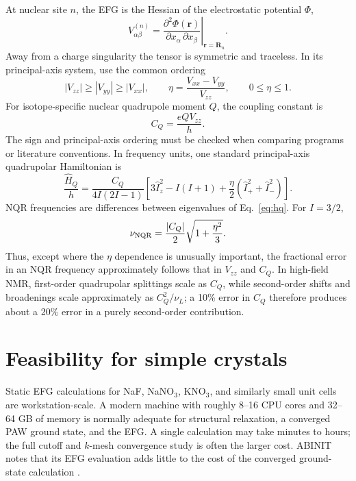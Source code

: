 \documentclass[10pt]{article}
\newcommand{\R}{\mathbf{R}}
\begin{document}
At nuclear site $n$, the EFG is the Hessian of the electrostatic potential $\Phi$,
\begin{equation}
  V_{\alpha\beta}^{(n)}=
  \left.\frac{\partial^2\Phi(\mathbf r)}{\partial x_\alpha\,\partial x_\beta}\right|_{\mathbf r=\R_n}.
\end{equation}
Away from a charge singularity the tensor is symmetric and traceless.  In its principal-axis system, use the common ordering
\begin{equation}
 |V_{zz}|\ge |V_{yy}|\ge |V_{xx}|,
 \qquad
 \eta=\frac{V_{xx}-V_{yy}}{V_{zz}},
 \qquad 0\le \eta\le 1.
\end{equation}
For isotope-specific nuclear quadrupole moment $Q$, the coupling constant is
\begin{equation}
  C_Q=\frac{eQV_{zz}}{h}.
  \label{eq:cq}
\end{equation}
The sign and principal-axis ordering must be checked when comparing programs or literature conventions.  In frequency units, one standard principal-axis quadrupolar Hamiltonian is
\begin{equation}
 \frac{\widehat H_Q}{h}=
 \frac{C_Q}{4I(2I-1)}
 \left[
 3\widehat I_z^2-I(I+1)
 +\frac{\eta}{2}\left(\widehat I_+^2+\widehat I_-^2\right)
 \right].
 \label{eq:hq}
\end{equation}
NQR frequencies are differences between eigenvalues of Eq.~\eqref{eq:hq}.  For $I=3/2$,
\begin{equation}
 \nu_{\rm NQR}=\frac{|C_Q|}{2}\sqrt{1+\frac{\eta^2}{3}}.
 \label{eq:i32}
\end{equation}
Thus, except where the $\eta$ dependence is unusually important, the fractional error in an NQR frequency approximately follows that in $V_{zz}$ and $C_Q$.  In high-field NMR, first-order quadrupolar splittings scale as $C_Q$, while second-order shifts and broadenings scale approximately as $C_Q^2/\nu_L$; a 10\% error in $C_Q$ therefore produces about a 20\% error in a purely second-order contribution.

\section{Feasibility for simple crystals}

Static EFG calculations for NaF, NaNO$_3$, KNO$_3$, and similarly small unit cells are workstation-scale.  A modern machine with roughly 8--16 CPU cores and 32--64 GB of memory is normally adequate for structural relaxation, a converged PAW ground state, and the EFG.  A single calculation may take minutes to hours; the full cutoff and $k$-mesh convergence study is often the larger cost.  ABINIT notes that its EFG evaluation adds little to the cost of the converged ground-state calculation \cite{abinitEFG}.
\end{document}
